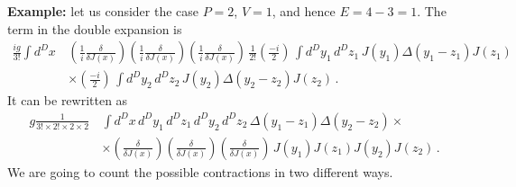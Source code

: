 \noindent
{\bf Example:} let us consider the case $P=2$, $V=1$, and hence
$E=4-3=1$. The term in the double expansion is
\begin{align}
  \frac{i g}{3!} \int d^Dx\, 
  & \left(\frac{1}{i}\frac{\delta}{\delta J(x)}\right)
    \left(\frac{1}{i}\frac{\delta}{\delta J(x)}\right)
    \left(\frac{1}{i}\frac{\delta}{\delta J(x)}\right)\,
    \frac{1}{2!} \left(\frac{-i}{2}\right)\, 
    \int d^Dy_1\, d^Dz_1\, J(y_1) \Delta(y_1-z_1) J(z_1) \nonumber \\  
  & \times  \left(\frac{-i}{2}\right)\, 
    \int d^Dy_2\, d^Dz_2\, J(y_2) \Delta(y_2-z_2) J(z_2)\, .
\end{align}
It can be rewritten as 
\begin{align}
  g \frac{1}{3! \times 2! \times 2 \times 2}\, 
  & \int d^Dx\, d^Dy_1\, d^Dz_1\, d^Dy_2\, d^Dz_2\, 
    \Delta(y_1-z_1) \Delta(y_2-z_2) \times \nonumber \\
  & \times \left(\frac{\delta}{\delta J(x)}\right)
    \left(\frac{\delta}{\delta J(x)}\right)
    \left(\frac{\delta}{\delta J(x)}\right)\,
    J(y_1) J(z_1) J(y_2) J(z_2)\, .
\end{align}
We are going to count the possible contractions in two different ways. 
